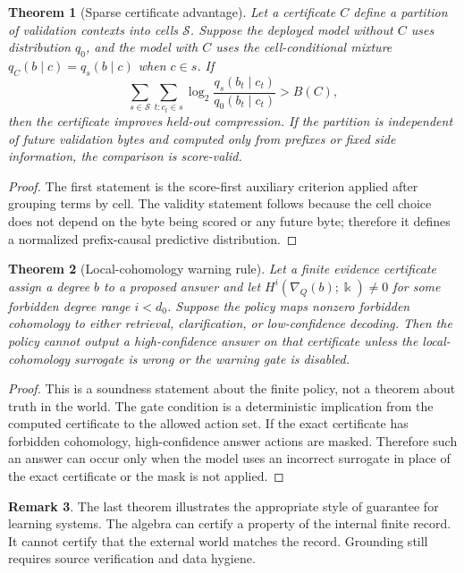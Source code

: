 \documentclass[11pt]{article}
\newtheorem{theorem}{Theorem}[section]
\theoremstyle{definition}
\newtheorem{remark}[theorem]{Remark}
\newcommand{\kk}{\Bbbk}
\begin{document}
\begin{theorem}[Sparse certificate advantage]
Let a certificate \(C\) define a partition of validation contexts into cells \(\mathcal{S}\).  Suppose the deployed model without \(C\) uses distribution \(q_0\), and the model with \(C\) uses the cell-conditional mixture \(q_C(b\mid c)=q_s(b\mid c)\) when \(c\in s\).  If
\[
\sum_{s\in\mathcal S}\sum_{t:c_t\in s}\log_2\frac{q_s(b_t\mid c_t)}{q_0(b_t\mid c_t)}>B(C),
\]
then the certificate improves held-out compression.  If the partition is independent of future validation bytes and computed only from prefixes or fixed side information, the comparison is score-valid.
\end{theorem}
\begin{proof}
The first statement is the score-first auxiliary criterion applied after grouping terms by cell.  The validity statement follows because the cell choice does not depend on the byte being scored or any future byte; therefore it defines a normalized prefix-causal predictive distribution.
\end{proof}

\begin{theorem}[Local-cohomology warning rule]
Let a finite evidence certificate assign a degree \(b\) to a proposed answer and let \(H^i(\nabla_Q(b);\kk)\ne 0\) for some forbidden degree range \(i<d_0\).  Suppose the policy maps nonzero forbidden cohomology to either retrieval, clarification, or low-confidence decoding.  Then the policy cannot output a high-confidence answer on that certificate unless the local-cohomology surrogate is wrong or the warning gate is disabled.
\end{theorem}
\begin{proof}
This is a soundness statement about the finite policy, not a theorem about truth in the world.  The gate condition is a deterministic implication from the computed certificate to the allowed action set.  If the exact certificate has forbidden cohomology, high-confidence answer actions are masked.  Therefore such an answer can occur only when the model uses an incorrect surrogate in place of the exact certificate or the mask is not applied.
\end{proof}

\begin{remark}
The last theorem illustrates the appropriate style of guarantee for learning systems.  The algebra can certify a property of the internal finite record.  It cannot certify that the external world matches the record.  Grounding still requires source verification and data hygiene.
\end{remark}
\end{document}
